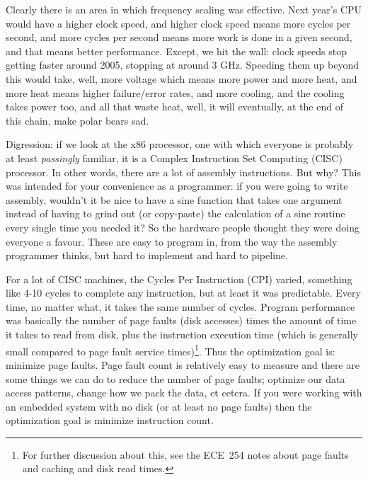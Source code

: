 \documentclass[a4paper]{report}
\begin{document}
Clearly there is an area in which frequency scaling was effective. Next year's CPU would have a higher clock speed, and higher clock speed means more cycles per second, and more cycles per second means more work is done in a given second, and that means better performance. Except, we hit the wall: clock speeds stop getting faster around 2005, stopping at around 3 GHz. Speeding them up beyond this would take, well, more voltage which means more power and more heat, and more heat means higher failure/error rates, and more cooling, and the cooling takes power too, and all that waste heat, well, it will eventually, at the end of this chain, make polar bears sad.

Digression: if we look at the x86 processor, one with which everyone is probably at least \textit{passingly} familiar, it is a Complex Instruction Set Computing (CISC) processor. In other words, there are a lot of assembly instructions. But why? This was intended for your convenience as a programmer: if you were going to write assembly, wouldn't it be nice to have a sine function that takes one argument instead of having to grind out (or copy-paste) the calculation of a sine routine every single time you needed it? So the hardware people thought they were doing everyone a favour. These are easy to program in, from the way the assembly programmer thinks, but hard to implement and hard to pipeline. 

For a lot of CISC machines, the Cycles Per Instruction (CPI) varied, something like 4-10 cycles to complete any instruction, but at least it was predictable. Every time, no matter what, it takes the same number of cycles. Program performance was basically the number of page faults (disk accesses) times the amount of time it takes to read from disk, plus the instruction execution time (which is generally small compared to page fault service times)\footnote{For further discussion about this, see the ECE~254 notes about page faults and caching and disk read times.}. Thus the optimization goal is: minimize page faults. Page fault count is relatively easy to measure and there are some things we can do to reduce the number of page faults; optimize our data access patterns, change how we pack the data, et cetera. If you were working with an embedded system with no disk (or at least no page faults) then the optimization goal is minimize instruction count.
\end{document}
